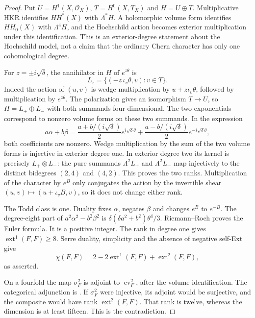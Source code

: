 \documentclass[11pt]{article}
\theoremstyle{definition}
\theoremstyle{remark}
\begin{document}
\begin{proof}
Put $U=H^1(X,\mathcal O_X)$, $T=H^0(X,T_X)$ and $H=U\oplus T$.
Multiplicative HKR identifies $HH^*(X)$ with $\Lambda^*H$.
A holomorphic volume form identifies $HH_0(X)$ with $\Lambda^4H$,
and the Hochschild action becomes exterior multiplication under this
identification.  This is an exterior-degree statement about the
Hochschild model, not a claim that the ordinary Chern character has
only one cohomological degree.

For $z=\pm i\sqrt\delta$, the annihilator in $H$ of $e^{z\theta}$ is
\[
 L_z=\{(-z\,\iota_v\theta,v):v\in T\}.
\]
Indeed the action of $(u,v)$ is wedge multiplication by
$u+z\iota_v\theta$, followed by multiplication by $e^{z\theta}$.
The polarization gives an isomorphism $T\to U$, so
$H=L_+\oplus L_-$ with both summands four-dimensional.  The two
exponentials correspond to nonzero volume forms on these two
summands.  In the expression
\[
 a\alpha+b\beta
 =\frac{a+b/(i\sqrt\delta)}2e^{i\sqrt\delta\theta}
  +\frac{a-b/(i\sqrt\delta)}2e^{-i\sqrt\delta\theta},
\]
both coefficients are nonzero.  Wedge multiplication by the sum of
the two volume forms is injective in exterior degree one.  In exterior
degree two its kernel is precisely $L_+\otimes L_-$: the pure
summands $\Lambda^2L_+$ and $\Lambda^2L_-$ map injectively to the
distinct bidegrees $(2,4)$ and $(4,2)$.  This proves the two ranks.
Multiplication of the character by $e^B$ only conjugates the action
by the invertible shear $(u,v)\mapsto(u+\iota_vB,v)$, so it does
not change either rank.

The Todd class is one.  Duality fixes $\alpha$, negates $\beta$ and
changes $e^B$ to $e^{-B}$.  The degree-eight part of
$a^2\alpha^2-b^2\beta^2$ is
$\delta(\delta a^2+b^2)\theta^4/3$.  Riemann--Roch proves the
Euler formula.  It is a positive integer.  The rank in degree one
gives $\operatorname{ext}^1(F,F)\ge8$.  Serre duality, simplicity
and the absence of negative self-Ext give
\[
 \chi(F,F)=2-2\operatorname{ext}^1(F,F)
                         +\operatorname{ext}^2(F,F),
\]
as asserted.

On a fourfold the map $\sigma_F^2$ is adjoint to
$\operatorname{ev}_F^2$, after the volume identification.  The
categorical adjunction is
\cite[Proposition~11, p.~83; \S7.3, pp.~88--89]{CaldararuWillerton}.
If $\sigma_F^2$ were injective, its adjoint would be surjective,
and the composite would have rank
$\operatorname{ext}^2(F,F)$.  That rank is twelve, whereas the
dimension is at least fifteen.  This is the contradiction.
\end{proof}
\end{document}
